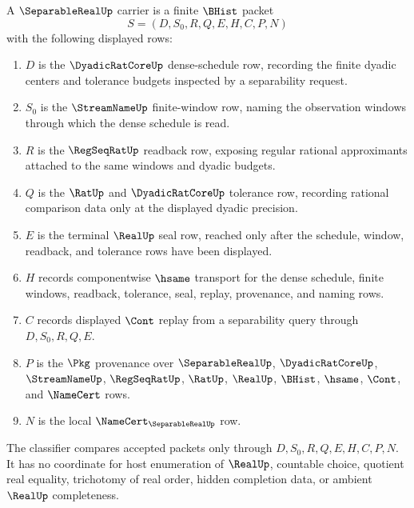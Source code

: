 \begin{definition}
\label{def:separable-real-carrier}
A $\SeparableRealUp$ carrier is a finite $\BHist$ packet
$$
S=(D,S_0,R,Q,E,H,C,P,N)
$$
with the following displayed rows:
\begin{enumerate}
\item $D$ is the $\DyadicRatCoreUp$ dense-schedule row, recording the finite dyadic centers and tolerance budgets inspected by a separability request.
\item $S_0$ is the $\StreamNameUp$ finite-window row, naming the observation windows through which the dense schedule is read.
\item $R$ is the $\RegSeqRatUp$ readback row, exposing regular rational approximants attached to the same windows and dyadic budgets.
\item $Q$ is the $\RatUp$ and $\DyadicRatCoreUp$ tolerance row, recording rational comparison data only at the displayed dyadic precision.
\item $E$ is the terminal $\RealUp$ seal row, reached only after the schedule, window, readback, and tolerance rows have been displayed.
\item $H$ records componentwise $\hsame$ transport for the dense schedule, finite windows, readback, tolerance, seal, replay, provenance, and naming rows.
\item $C$ records displayed $\Cont$ replay from a separability query through $D,S_0,R,Q,E$.
\item $P$ is the $\Pkg$ provenance over $\SeparableRealUp$, $\DyadicRatCoreUp$, $\StreamNameUp$, $\RegSeqRatUp$, $\RatUp$, $\RealUp$, $\BHist$, $\hsame$, $\Cont$, and $\NameCert$ rows.
\item $N$ is the local $\NameCert_{\SeparableRealUp}$ row.
\end{enumerate}
The classifier compares accepted packets only through $D,S_0,R,Q,E,H,C,P,N$. It has no coordinate for host enumeration of $\RealUp$, countable choice, quotient real equality, trichotomy of real order, hidden completion data, or ambient $\RealUp$ completeness.
\end{definition}

